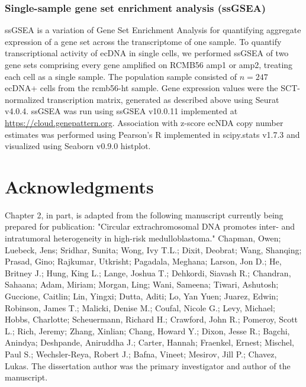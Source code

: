 \subsubsection{Single-sample gene set enrichment analysis (ssGSEA)}
\label{methods:ssgsea}
ssGSEA is a variation of Gene Set Enrichment Analysis for quantifying aggregate expression of a gene set across the  transcriptome of one sample\cite{ssGSEA_2009}. To quantify transcriptional activity of ecDNA in single cells, we performed ssGSEA of two gene sets comprising every gene amplified on RCMB56 amp1 or amp2, treating each cell as a single sample. The population sample consisted of $n = 247$ ecDNA+ cells from the \acrshort{rcmb56-ht} sample. Gene expression values were the SCT-normalized transcription matrix, generated as described above using Seurat v4.0.4. ssGSEA was run using ssGSEA v10.0.11 implemented at \url{https://cloud.genepattern.org}\cite{genepattern_nb}. Association with z-score ecNDA copy number estimates was performed using Pearson's R implemented in scipy.stats v1.7.3 and visualized using Seaborn v0.9.0\cite{seaborn} histplot.

\section{Acknowledgments}

\ackfunding

\par Chapter 2, in part, is adapted from the following manuscript currently being prepared for publication: "Circular extrachromosomal DNA promotes inter- and intratumoral heterogeneity in high-risk medulloblastoma." Chapman, Owen; Luebeck, Jens; Sridhar, Sunita; Wong, Ivy T.L.; Dixit, Deobrat; Wang, Shanqing; Prasad, Gino; Rajkumar, Utkrisht; Pagadala, Meghana; Larson, Jon D.; He, Britney J.; Hung, King L.; Lange, Joshua T.; Dehkordi, Siavash R.; Chandran, Sahaana; Adam, Miriam; Morgan, Ling; Wani, Sameena; Tiwari, Ashutosh; Guccione, Caitlin; Lin, Yingxi; Dutta, Aditi; Lo, Yan Yuen; Juarez, Edwin; Robinson, James T.; Malicki, Denise M.; Coufal, Nicole G.; Levy, Michael; Hobbs, Charlotte; Scheuermann, Richard H.; Crawford, John R.; Pomeroy, Scott L.; Rich, Jeremy; Zhang, Xinlian; Chang, Howard Y.; Dixon, Jesse R.; Bagchi, Anindya; Deshpande, Aniruddha J.; Carter, Hannah; Fraenkel, Ernest; Mischel, Paul S.; Wechsler-Reya, Robert J.; Bafna, Vineet; Mesirov, Jill P.; Chavez, Lukas. The dissertation author was the primary investigator and author of the manuscript.